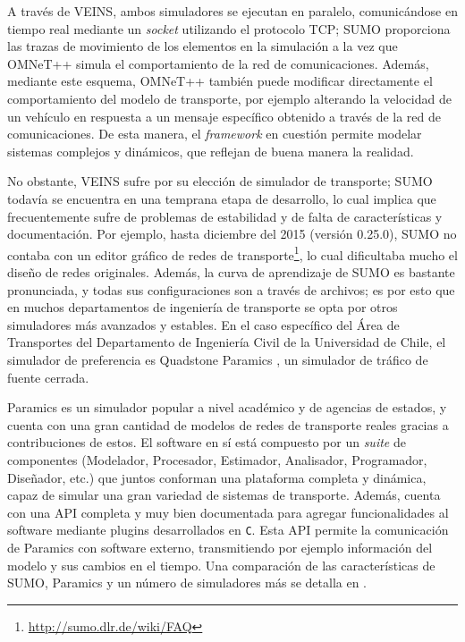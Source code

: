 A través de VEINS, ambos simuladores se ejecutan en paralelo, comunicándose en tiempo real mediante un \textit{socket} utilizando el protocolo TCP; SUMO proporciona las trazas de movimiento de los elementos en la simulación a la vez que OMNeT++ simula el comportamiento de la red de comunicaciones. Además, mediante este esquema, OMNeT++ también puede modificar directamente el comportamiento del modelo de transporte, por ejemplo alterando la velocidad de un vehículo en respuesta a un mensaje específico obtenido a través de la red de comunicaciones. De esta manera, el \textit{framework} en cuestión permite modelar sistemas complejos y dinámicos, que reflejan de buena manera la realidad.

No obstante, VEINS sufre por su elección de simulador de transporte; SUMO todavía se encuentra en una temprana etapa de desarrollo, lo cual implica que frecuentemente sufre de problemas de estabilidad y de falta de características y documentación. Por ejemplo, hasta diciembre del 2015 (versión 0.25.0), SUMO no contaba con un editor gráfico de redes de transporte\footnote{\url{http://sumo.dlr.de/wiki/FAQ}}, lo cual dificultaba mucho el diseño de redes originales. Además, la curva de aprendizaje de SUMO es bastante pronunciada, y todas sus configuraciones son a través de archivos; es por esto que en muchos departamentos de ingeniería de transporte se opta por otros simuladores más avanzados y estables. En el caso específico del Área de Transportes del Departamento de Ingeniería Civil de la Universidad de Chile, el simulador de preferencia es Quadstone Paramics \cite{paramics,kotusevski2009review}, un simulador de tráfico de fuente cerrada.

Paramics es un simulador popular a nivel académico y de agencias de estados, y cuenta con una gran cantidad de modelos de redes de transporte reales gracias a contribuciones de estos. El software en sí está compuesto por un \textit{suite} de componentes (Modelador,
Procesador, Estimador, Analisador, Programador, Diseñador, etc.) que juntos conforman una plataforma completa y dinámica, capaz de simular una gran variedad de sistemas de transporte. Además, cuenta con una API completa y muy bien documentada para agregar funcionalidades al software mediante plugins desarrollados en \texttt{C}. Esta API permite la comunicación de Paramics con software externo, transmitiendo por ejemplo información del modelo y sus cambios en el tiempo. Una comparación de las características de SUMO, Paramics y un número de simuladores más se detalla en  \cite{kotusevski2009review}.

